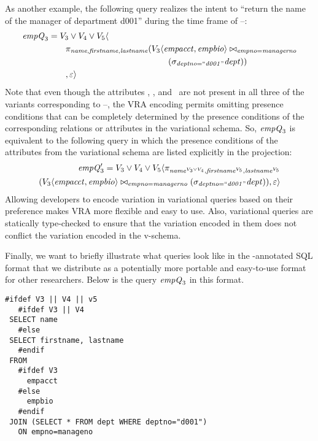 As another example, the following query realizes the intent to ``return the
name of the manager of department d001'' during the time frame of
\vThree--\vFive:
%
\begin{align*}
\eq_3 &= \vThree\vee\vFour\vee\vFive \langle\\
&\qquad  \pi_{\name,\fname,\lname} 
({\chc[\vThree]{\empacct,\empbio}}
          \bowtie_{\empno=\managerno}\\
&\qquad \qquad \qquad \qquad \qquad \qquad \qquad {(\vSel[\deptno=\deptOne]{\dept})}
)\\
&\qquad           ,
  \empRel \rangle
\end{align*}
%
\noindent
Note that even though the attributes \name, \fname, and \lname\ are not present
in all three of the variants corresponding to \vThree--\vFive, the VRA encoding
permits omitting presence conditions that can be completely determined by the
presence conditions of the corresponding relations or attributes in the
variational schema. So, $\eq_3$ is equivalent to the following query in which the
presence conditions of the attributes from the variational schema are listed
explicitly in the projection:
%
\begin{align*}
\VVal {\eq_3} = \vThree\vee\vFour\vee\vFive \langle
  \pi_{\oatt{\name}{\vThree\vee\vFour},\oatt{\fname}{\vFive},\oatt{\lname}{\vFive}} 
  \\
  (\joinRel{\chc[\vThree]{\empacct,\empbio}}{(\vSel[\deptno=\deptOne]{\dept})}
           {\empno=\managerno}),
  \empRel \rangle
\end{align*}
%
%
 \noindent
Allowing developers to encode variation in variational queries based on their
preference makes VRA more flexible and easy to use. 
Also, variational queries are statically type-checked to ensure that
the variation encoded in them does not conflict the variation encoded
in the v-schema. 

 Finally, we want to briefly illustrate what queries look like in the
 -annotated SQL format that we distribute as a potentially more
 portable and easy-to-use format for other researchers. Below is the query $\eq_3$
 in this format.
 
 \begin{lstlisting}[basicstyle=\footnotesize\ttfamily,columns=flexible,lineskip=0.5\baselineskip]
 #ifdef V3 || V4 || v5
   #ifdef V3 || V4
 SELECT name
   #else
 SELECT firstname, lastname
   #endif
 FROM
   #ifdef V3
     empacct
   #else
     empbio
   #endif
 JOIN (SELECT * FROM dept WHERE deptno="d001")
   ON empno=manageno  
 \end{lstlisting}


%
